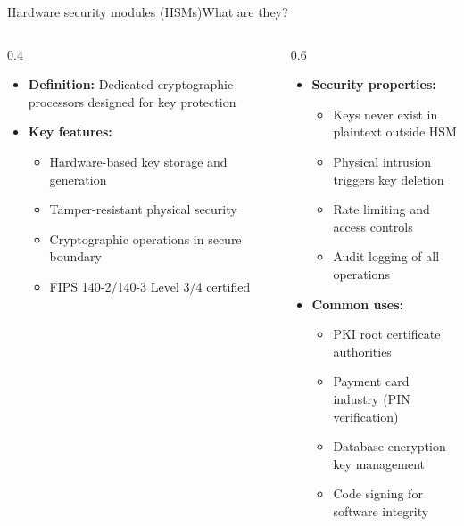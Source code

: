 \ifdefined\PRESENTATION\else\PassOptionsToClass{handout}{beamer}\fi\documentclass[aspectratio=169, lualatex]{beamer}
\begin{document}
\begin{frame}{Hardware security modules (HSMs)}{What are they?}
	\begin{columns}[c]
		\begin{column}{0.4\textwidth}
			\begin{itemize}
				\item \textbf{Definition:} Dedicated cryptographic processors designed for key protection
				\item \textbf{Key features:}
				      \begin{itemize}
					      \item Hardware-based key storage and generation
					      \item Tamper-resistant physical security
					      \item Cryptographic operations in secure boundary
					      \item FIPS 140-2/140-3 Level 3/4 certified
				      \end{itemize}
			\end{itemize}
		\end{column}
		\begin{column}{0.6\textwidth}
			\begin{itemize}
				\item \textbf{Security properties:}
				      \begin{itemize}
					      \item Keys never exist in plaintext outside HSM
					      \item Physical intrusion triggers key deletion
					      \item Rate limiting and access controls
					      \item Audit logging of all operations
				      \end{itemize}
				\item \textbf{Common uses:}
				      \begin{itemize}
					      \item PKI root certificate authorities
					      \item Payment card industry (PIN verification)
					      \item Database encryption key management
					      \item Code signing for software integrity
				      \end{itemize}
			\end{itemize}
		\end{column}
	\end{columns}
\end{frame}
\end{document}
